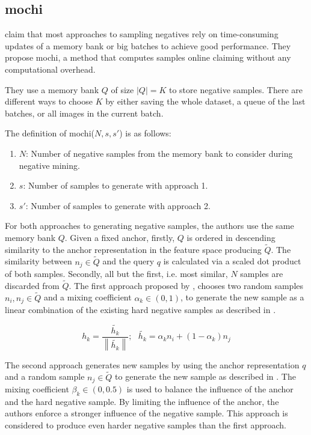 \subsection{\acl{mochi}}\label{subsec:MoCHi}

\citet{mochi_2020} claim that most approaches to sampling negatives rely on 
time-consuming updates of a memory bank or big batches to achieve good performance.
They propose \ac{mochi}, a method that computes samples online claiming without any computational overhead.

They use a memory bank $Q$ of size $| Q | = K$ to store negative samples.
There are different ways to choose $K$ by either saving the whole dataset, a queue of the last batches,
or all images in the current batch.

The definition of \ac{mochi}($N, s, s'$) is as follows:
\begin{enumerate}
    \item $N$: Number of negative samples from the memory bank to consider during negative mining.
    \item $s$: Number of samples to generate with approach 1.
    \item $s'$: Number of samples to generate with approach 2.
\end{enumerate}
For both approaches to generating negative samples, the authors use the same memory bank $Q$.
Given a fixed anchor, firstly, $Q$ is ordered in descending similarity to the anchor representation    
in the feature space producing $\tilde{Q}$.
The similarity between $n_j \in \tilde{Q}$ and the query $q$ is calculated via 
a scaled dot product of both samples.
Secondly, all but the first, i.e. most similar, $N$ samples are discarded from $\tilde{Q}$.
The first approach proposed by \citeauthor{mochi_2020}, chooses two random samples $n_i, n_j \in \tilde{Q}$ 
and a mixing coefficient $\alpha_k \in (0,1)$, 
to generate the new sample as a linear combination of the existing hard negative samples 
as described in .

\begin{equation}
    h_k = \frac{\tilde{h_k}}{\left\| \tilde{h_k}  \right\|}; \text{  } \tilde{h_k} = \alpha_k n_i + (1-\alpha_k)n_j
    \label{eq:mochi_appr1}
\end{equation}

The second approach generates new samples by using the anchor representation $q$ 
and a random sample $n_j \in \tilde{Q}$ to generate the new sample as described in .
The mixing coefficient $\beta_k \in (0,0.5)$ is used to balance the influence of the anchor 
and the hard negative sample.
By limiting the influence of the anchor, the authors enforce a stronger influence of the negative sample.
This approach is considered to produce even harder negative samples than the first approach.

